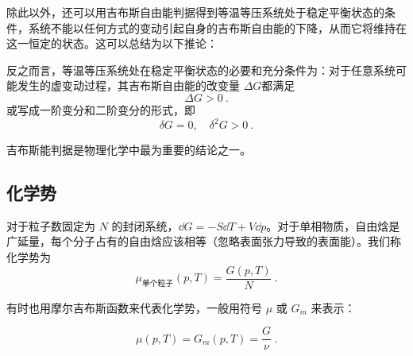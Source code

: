 除此以外，还可以用吉布斯自由能判据得到等温等压系统处于稳定平衡状态的条件，系统不能以任何方式的变动引起自身的吉布斯自由能的下降，从而它将维持在这一恒定的状态。这可以总结为以下推论：

\begin{corollary}{}
反之而言，等温等压系统处在稳定平衡状态的必要和充分条件为：对于任意系统可能发生的虚变动过程，其吉布斯自由能的改变量 $\Delta G$都满足
\begin{equation}
\Delta G>0~.
\end{equation}
或写成一阶变分和二阶变分的形式，即
\begin{equation}\label{eq_GibbsG_2}
\delta G=0,\quad \delta^2 G>0~.
\end{equation}
\end{corollary}

吉布斯能判据是物理化学中最为重要的结论之一。


\subsection{化学势}

对于粒子数固定为 $N$ 的封闭系统，$\dd G=-S\dd T+V\dd p$。对于单相物质，自由焓是广延量，每个分子占有的自由焓应该相等（忽略表面张力导致的表面能）。我们称化学势为
\begin{equation}
\mu_{\text{单个粒子}}(p,T)=\frac{G(p,T)}{N}~.
\end{equation}

有时也用摩尔吉布斯函数来代表化学势，一般用符号 $\mu$ 或 $G_m$ 来表示：

\begin{equation}\label{eq_GibbsG_1}
\mu(p,T)=G_m(p,T)=\frac{G}{\nu}~.
\end{equation}

